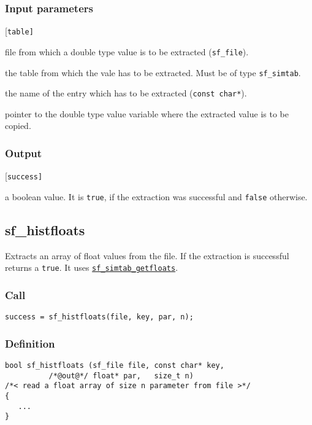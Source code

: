 \subsubsection*{Input parameters}
\begin{desclist}{\tt }{\quad}[\tt table]
   \setlength\itemsep{0pt}
   \item[file]  file from which a double type value is to be extracted (\texttt{sf\_file}). 
   \item[table] the table from which the vale has to be extracted. Must be of type \texttt{sf\_simtab}.
   \item[key]   the name of the entry which has to be extracted (\texttt{const char*}).
   \item[par]   pointer to the double type value variable where the extracted value is to be copied.
\end{desclist}

\subsubsection*{Output}
\begin{desclist}{\tt }{\quad}[\tt success]
   \setlength\itemsep{0pt}
   \item[success] a boolean value. It is \texttt{true}, if the extraction was successful and \texttt{false} otherwise.
\end{desclist}




\subsection{{sf\_histfloats}}
Extracts an array of float values from the file. If the extraction is successful returns a \texttt{true}. It uses \hyperref[sec:sf_simtab_getfloats]{\texttt{sf\_simtab\_getfloats}}.

\subsubsection*{Call}
\begin{verbatim}success = sf_histfloats(file, key, par, n);\end{verbatim}

\subsubsection*{Definition}
\begin{verbatim}
bool sf_histfloats (sf_file file, const char* key,
          /*@out@*/ float* par,   size_t n) 
/*< read a float array of size n parameter from file >*/ 
{
   ...
}
\end{verbatim}

